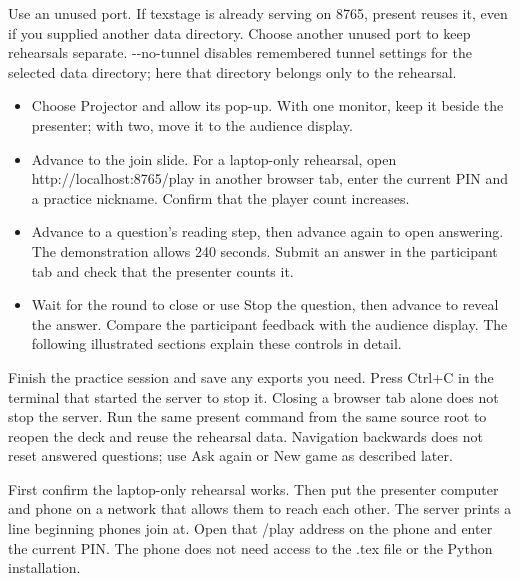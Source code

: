 \documentclass[a4paper,11pt]{article}
\begin{document}
Use an unused port.\allowbreak{} If texstage is already serving on 8765, present reuses it, even if you supplied another data directory.\allowbreak{} Choose another unused port to keep rehearsals separate.\allowbreak{} -\allowbreak{}-\allowbreak{}no-\allowbreak{}tunnel disables remembered tunnel settings for the selected data directory; here that directory belongs only to the rehearsal.\par

\begin{itemize}
\item Choose Projector and allow its pop-\allowbreak{}up.\allowbreak{} With one monitor, keep it beside the presenter; with two, move it to the audience display.
\item Advance to the join slide.\allowbreak{} For a laptop-\allowbreak{}only rehearsal, open http:/\allowbreak{}/\allowbreak{}localhost:8765/\allowbreak{}play in another browser tab, enter the current PIN and a practice nickname.\allowbreak{} Confirm that the player count increases.
\item Advance to a question's reading step, then advance again to open answering.\allowbreak{} The demonstration allows 240 seconds.\allowbreak{} Submit an answer in the participant tab and check that the presenter counts it.
\item Wait for the round to close or use Stop the question, then advance to reveal the answer.\allowbreak{} Compare the participant feedback with the audience display.\allowbreak{} The following illustrated sections explain these controls in detail.
\end{itemize}

Finish the practice session and save any exports you need.\allowbreak{} Press Ctrl+C in the terminal that started the server to stop it.\allowbreak{} Closing a browser tab alone does not stop the server.\allowbreak{} Run the same present command from the same source root to reopen the deck and reuse the rehearsal data.\allowbreak{} Navigation backwards does not reset answered questions; use Ask again or New game as described later.\par

\label{sec:move-from-one-laptop-to-a-real-phone}
First confirm the laptop-\allowbreak{}only rehearsal works.\allowbreak{} Then put the presenter computer and phone on a network that allows them to reach each other.\allowbreak{} The server prints a line beginning phones join at.\allowbreak{} Open that /\allowbreak{}play address on the phone and enter the current PIN.\allowbreak{} The phone does not need access to the .\allowbreak{}tex file or the Python installation.\par
\end{document}
